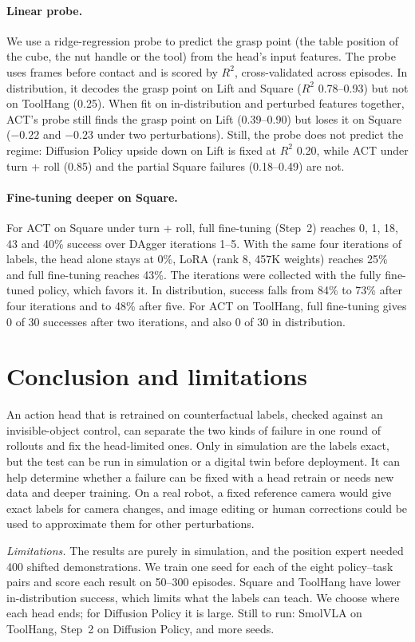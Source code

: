 \documentclass[10pt]{article}
\begin{document}
\paragraph{Linear probe.} We use a ridge-regression probe to predict the grasp point (the table position of the cube, the nut handle
or the tool) from the head's input features. The probe uses frames before contact and
is scored by $R^2$, cross-validated across episodes. In distribution, it decodes the grasp point
on Lift and Square ($R^2$ 0.78--0.93) but not on ToolHang (0.25).
When fit on in-distribution and perturbed features together, ACT's probe still finds the grasp
point on Lift (0.39--0.90) but loses it on Square ($-0.22$ and $-0.23$ under two perturbations). Still, the probe does not predict the regime: Diffusion
Policy upside down on Lift is fixed at $R^2$ 0.20, while ACT under turn + roll (0.85) and the partial
Square failures (0.18--0.49) are not.

\paragraph{Fine-tuning deeper on Square.} For ACT on Square under turn + roll, full fine-tuning (Step~2)
reaches 0, 1, 18, 43 and 40\% success over DAgger iterations 1--5. With the same four iterations of labels, the head alone stays at 0\%, LoRA
(rank 8, 457K weights) reaches 25\% and full fine-tuning reaches 43\%. The iterations were
collected with the fully fine-tuned policy, which favors it. In distribution, success
falls from 84\% to 73\% after four iterations and to 48\% after five. For ACT on ToolHang,
full fine-tuning gives 0 of 30 successes after two iterations, and also 0 of 30 in distribution.

\section{Conclusion and limitations}
\label{sec:conclusion}
An action head that is retrained on counterfactual labels, checked against an invisible-object control, can separate the
two kinds of failure in one round of rollouts and fix the head-limited ones. Only in simulation are the labels exact,
but the test can be run in simulation or a digital twin before deployment. It can help determine whether a failure can be fixed
with a head retrain or needs new data and deeper training. On a real robot, a fixed reference camera would give exact labels for camera changes,
and image editing or human corrections could be used to approximate them for other perturbations.

\emph{Limitations.} The results are purely in simulation, and the position expert needed 400 shifted
demonstrations. We train one seed for each of the eight policy--task pairs and score each result on 50--300 episodes. Square and ToolHang
have lower in-distribution success, which limits what the labels can teach. We choose where each
head ends; for Diffusion Policy it is large. Still to run: SmolVLA on ToolHang, Step~2 on Diffusion Policy, and more seeds.



\end{document}
